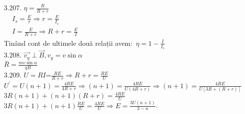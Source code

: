 3.207. $\eta=\frac{R}{R+r}$\\ $\begin{aligned}& I_{s}=\frac{E}{r} \Rightarrow r=\frac{E}{I_{s}}\\ & I=\frac{E}{R+r} \Rightarrow R+r=\frac{E}{I}\end{aligned}$\\ Tinând cont de ultimele două relații avem:\ $\eta=1-\frac{I}{I_{s}}$\\

3.208. $\overrightarrow{v_{y}} \perp \vec{B}, v_{y}=v \sin \alpha$\\ $\bar{R}=\frac{m v \sin \alpha}{q B}$\\

3.209. $U=R I$=$\frac{R E}{R+r} \Rightarrow R+r=\frac{R E}{U}$\\ $U^{\prime}=U(n+1)=\frac{4 R E}{4 R+r} \Rightarrow(n+1)=\frac{4 R E}{U(4 R+r)} \Rightarrow(n+1)=\frac{4 R E}{U[3 R+(R+r)]}$\\ $3 R(n+1)+(n+1)(R+r)=\frac{4 R E}{U}$\\ $3 R(n+1)+(n+1) \frac{R E}{U}=\frac{4 R E}{U} \Rightarrow E=\frac{3 U(n+1)}{3-n}$.\\

